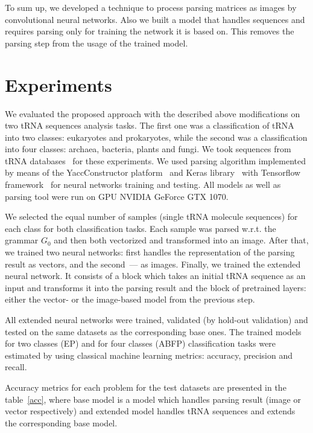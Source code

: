 \documentclass[runningheads]{llncs}
\begin{document}
To sum up, we developed a technique to process parsing matrices as images by convolutional neural networks. Also we built a model that handles sequences and requires parsing only for training the network it is based on. This removes the parsing step from the usage of the trained model.

\section{Experiments}
We evaluated the proposed approach with the described above modifications on two tRNA sequences analysis tasks.
The first one was a classification of tRNA into two classes: eukaryotes and prokaryotes, while the second was a classification into four classes: archaea, bacteria, plants and fungi.
We took sequences from tRNA databases~\cite{trnadb1,trnadb2} for these experiments. We used parsing algorithm implemented by means of the YaccConstructor platform~\cite{yaccconstructor} and Keras library~\cite{keras} with Tensorflow framework~\cite{tensorflow} for neural networks training and testing. All models as well as parsing tool were run on GPU NVIDIA GeForce GTX 1070.

We selected the equal number of samples (single tRNA molecule sequences) for each class for both classification tasks.
Each sample was parsed w.r.t. the grammar $G_0$ and then both vectorized and transformed into an image.
After that, we trained two neural networks: first handles the representation of the parsing result as vectors, and the second~--- as images.
Finally, we trained the extended neural network.
It consists of a block which takes an initial tRNA sequence as an input and transforms it into the parsing result and the block of pretrained layers: either the vector- or the image-based model from the previous step. 

All extended neural networks were trained, validated (by hold-out validation) and tested on the same datasets as the corresponding base ones.
The trained models for two classes (EP) and for four classes (ABFP) classification tasks were estimated by using classical machine learning metrics: accuracy, precision and recall.

Accuracy metrics for each problem for the test datasets are presented in the table~\ref{acc}, where base model is a model which handles parsing result (image or vector respectively) and extended model handles tRNA sequences and extends the corresponding base model.


\end{document}
